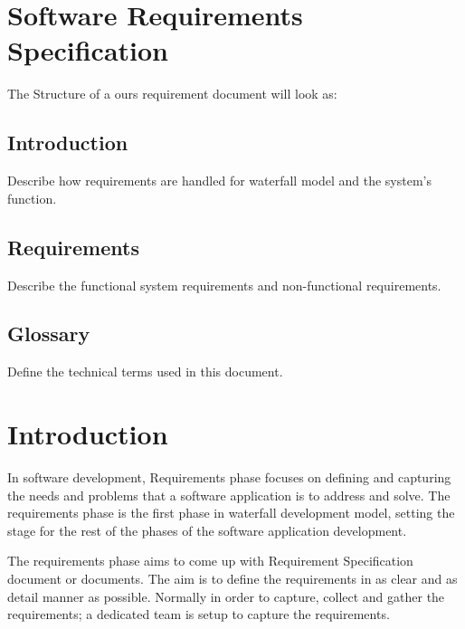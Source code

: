 \renewcommand{\headrulewidth}{0.1pt}
\renewcommand{\footrulewidth}{0.1pt}

\section*{Software Requirements Specification}

The Structure of a ours requirement document will look as:

\subsection*{Introduction}
Describe how requirements are handled for waterfall model and the system’s function.

\subsection*{Requirements}
Describe the functional system requirements and non-functional requirements.

\subsection*{Glossary}
Define the technical terms used in this document. 

\section*{Introduction}
In software development, Requirements phase focuses on defining and capturing the needs and problems that a software application is to address and solve. The requirements phase is the first phase in waterfall development model, setting the stage for the rest of the phases of the software application development. 


The requirements phase aims to come up with Requirement Specification document or documents. The aim is to define the requirements in as clear and as detail manner as possible. Normally in order to capture, collect and gather the requirements; a dedicated team is setup to capture the requirements. 


